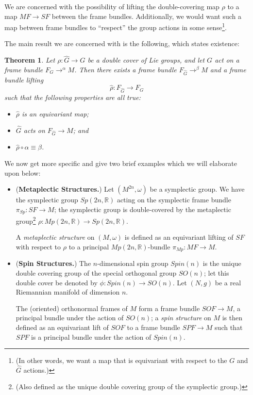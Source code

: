 \documentclass{tufte-handout}
\newtheorem{thrm}{Theorem} %
\begin{document}
We are concerned with the possibility of lifting the double-covering map $\rho$ to a map $MF \to SF$ between the frame bundles. Additionally, we would want such a map between frame bundles to ``respect'' the group actions in some sense\footnote{(In other words, we want a map that is equivariant with respect to the $G$ and $\hat{G}$ actions.)}.

The main result we are concerned with is the following, which states existence:
\begin{fullwidth}
\begin{thrm} %
Let $\rho: \hat{G} \to G$ be a double cover of Lie groups, and let $G$ act on a frame bundle $F_G \to^{\alpha} M$. Then there exists a frame bundle $F_{\hat{G}} \to^{\beta} M$ and a frame bundle lifting
$$
\hat{\rho} : F_{\hat{G}} \to F_G
$$
such that the following properties are all true:
\begin{itemize}
\item $\hat{\rho}$ is an equivariant map;
\item $\hat{G}$ acts on $F_{\hat{G}} \to M$; and
\item $\hat{\rho} \circ \alpha \equiv \beta$.
\end{itemize}
\end{thrm}
\end{fullwidth}

We now get more specific and give two brief examples which we will elaborate upon below:
\begin{itemize}
\item (\textbf{Metaplectic Structures.}) Let $(M^{2n},\omega)$ be a symplectic group. We have the symplectic group $Sp(2n,\mathbb{R})$ acting on the symplectic frame bundle $\pi_{Sp}: SF \to M$; the symplectic group is double-covered by the metaplectic group\footnote{(Also defined as the unique double covering group of the symplectic group.)} $\rho: Mp(2n,\mathbb{R}) \to Sp(2n,\mathbb{R})$.

A \emph{metaplectic structure} on $(M,\omega)$ is defined as an equivariant lifting of $SF$ with respect to $\rho$ to a principal $Mp(2n,\mathbb{R})$-bundle $\pi_{Mp}: MF \to M$.

\item (\textbf{Spin Structures.}) The $n$-dimensional spin group $Spin(n)$ is the unique double covering group of the special orthogonal group $SO(n)$; let this double cover be denoted by $\phi: Spin(n) \to SO(n)$. Let $(N,g)$ be a real Riemannian manifold of dimension $n$.

The (oriented) orthonormal frames of $M$ form a frame bundle $SOF \to M$, a principal bundle under the action of $SO(n)$; a \emph{spin structure} on $M$ is then defined as an equivariant lift of $SOF$ to a frame bundle $SPF \to M$ such that $SPF$ is a principal bundle under the action of $Spin(n)$.
\end{itemize}
\end{document}
